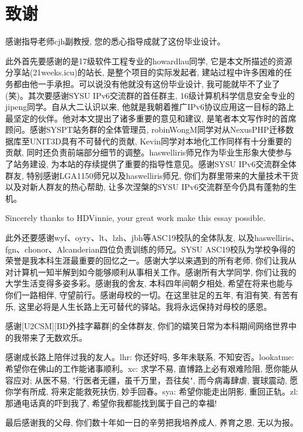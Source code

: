 
\chapter{致谢}

感谢指导老师cjh副教授, 您的悉心指导成就了这份毕业设计。

此外首先要感谢的是17级软件工程专业的howardlau同学, 它是本文所描述的资源分享站(21weeks.icu)的站长, 是整个项目的实际发起者, 建站过程中许多困难的任务都由他一手承担。可以说没有他就没有这份毕业设计, 我可能就毕不了业了(笑)。其次要感谢SYSU IPv6交流群的首任群主, 16级计算机科学信息安全专业的jipeng同学。自从大二认识以来, 他就是我朝着推广IPv6协议应用这一目标的路上最坚定的伙伴。他对本文提出了诸多重要的意见和建议, 是笔者本文写作时的首席顾问。感谢SYSPT站务群的全体管理员, robinWongM同学对从NexusPHP迁移数据库至UNIT3D具有不可替代的贡献, Kevin同学对本地化工作同样有十分重要的贡献, 同时还负责前端部分细节的调整。haswelliris师兄作为毕业生形象大使参与了站务建设, 为本站的存续提供了重要的指导性意见。感谢SYSU IPv6交流群全体群友, 特别感谢LGA1150师兄以及haswelliris师兄, 你们为群里带来的大量技术干货以及对新人群友的热心帮助, 让多次涅槃的SYSU IPv6交流群至今仍具有蓬勃的生机。

Sincerely thanks to HDVinnie, your great work make this essay possible.

此外还要感谢wyf、oyry、lt、lzh、jbh等ASC19校队的全体队友, 以及haswelliris、fgn、chonor、Alcanderian四位负责训练的师兄。SYSU ASC19校队为学校争得的荣誉是我本科生涯最重要的回忆之一。感谢大学以来遇到的所有老师, 你们让我从对计算机一知半解到如今能够顺利从事相关工作。感谢所有大学同学, 你们让我的大学生活变得多姿多彩。感谢我的舍友, 本科四年间朝夕相处, 希望在将来也能与你们一路相伴, 守望前行。感谢母校的一切。在这里驻足的五年, 有泪有笑, 有苦有乐, 这里必将是人生长路上无可替代的驿站。我将永远保持对母校的感恩。

感谢[U2CSM][BD外挂字幕群]的全体群友, 你们的嬉笑日常为本科期间网络世界中的我带来了无数欢乐。

感谢成长路上陪伴过我的友人。lhr: 你还好吗, 多年未联系, 不知安否。lookatme: 希望你在佛山的工作能诸事顺利。xc: 求学不易, 直博路上必有艰难险阻, 愿你能从容应对; 从医不易, "行医者无疆，虽千万里，吾往矣", 而今病毒肆虐, 寰球震动, 愿你学有所成, 将来定能救死扶伤, 妙手回春。sya: 希望你能走出阴影, 重回正轨。zl: 那通电话真的吓到我了, 希望你我都能找到属于自己的幸福!

最后感谢我的父母, 你们数十年如一日的辛劳把我培养成人, 养育之恩, 无以为报。
